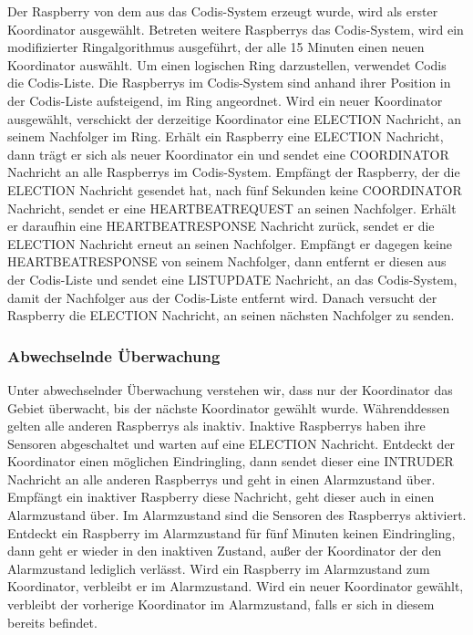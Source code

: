 \documentclass[journal]{IEEEtran}
\begin{document}
Der Raspberry von dem aus das Codis-System erzeugt wurde, wird als erster Koordinator ausgewählt. Betreten weitere Raspberrys das Codis-System, wird ein modifizierter Ringalgorithmus\cite{verteilte1}\cite{verteilte2} ausgeführt, der alle 15 Minuten einen neuen Koordinator auswählt. Um einen logischen Ring darzustellen, verwendet Codis die Codis-Liste. Die Raspberrys im Codis-System sind anhand ihrer Position in der Codis-Liste aufsteigend, im Ring angeordnet. Wird ein neuer Koordinator ausgewählt, verschickt der derzeitige Koordinator eine \MakeUppercase{election} Nachricht, an seinem Nachfolger im Ring. Erhält ein Raspberry eine \MakeUppercase{election} Nachricht, dann trägt er sich als neuer Koordinator ein und sendet eine \MakeUppercase{coordinator} Nachricht an alle Raspberrys im Codis-System. Empfängt der Raspberry, der die \MakeUppercase{election} Nachricht gesendet hat, nach fünf Sekunden keine \MakeUppercase{coordinator} Nachricht, sendet er eine \MakeUppercase{heartbeatrequest} an seinen Nachfolger. Erhält er daraufhin eine \MakeUppercase{heartbeatresponse} Nachricht zurück, sendet er die \MakeUppercase{election} Nachricht erneut an seinen Nachfolger. Empfängt er dagegen keine \MakeUppercase{heartbeatresponse} von seinem Nachfolger, dann entfernt er diesen aus der Codis-Liste und sendet eine \MakeUppercase{listupdate} Nachricht, an das Codis-System, damit der Nachfolger aus der Codis-Liste entfernt wird. Danach versucht der Raspberry die \MakeUppercase{election} Nachricht, an seinen nächsten Nachfolger zu senden.

\subsubsection{Abwechselnde Überwachung}

Unter abwechselnder Überwachung verstehen wir, dass nur der Koordinator das Gebiet überwacht, bis der nächste Koordinator gewählt wurde. Währenddessen gelten alle anderen Raspberrys als inaktiv. Inaktive Raspberrys haben ihre Sensoren abgeschaltet und warten auf eine \MakeUppercase{election} Nachricht. Entdeckt der Koordinator einen möglichen Eindringling, dann sendet dieser eine \MakeUppercase{intruder} Nachricht an alle anderen Raspberrys und geht in einen Alarmzustand über. Empfängt ein inaktiver Raspberry diese Nachricht, geht dieser auch in einen Alarmzustand über. Im Alarmzustand sind die Sensoren des Raspberrys aktiviert. Entdeckt ein Raspberry im Alarmzustand für fünf Minuten keinen Eindringling, dann geht er wieder in den inaktiven Zustand, außer der Koordinator der den Alarmzustand lediglich verlässt. Wird ein Raspberry im Alarmzustand zum Koordinator, verbleibt er im Alarmzustand. Wird ein neuer Koordinator gewählt, verbleibt der vorherige Koordinator im Alarmzustand, falls er sich in diesem bereits befindet.
\end{document}
